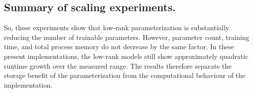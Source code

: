 \documentclass[12pt,oneside]{report}
\newcommand{\backmatter}{\clearpage\singlespacing}
\begin{document}
\subsection{Summary of scaling experiments.}

So, these experiments show that low-rank parameterization is substantially
reducing the number of trainable parameters. However, parameter count,
training time, and total process memory do not decrease by the same
factor. In these present implementations, the low-rank models still
show approximately quadratic runtime growth over the measured range.
The results therefore separate the storage benefit of the parameterization
from the computational behaviour of the implementation. 


\appendix
\backmatter


\end{document}

